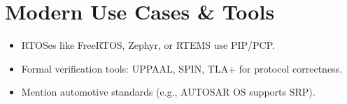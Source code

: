 \documentclass{article}
\begin{document}
 
\section{Modern Use Cases & Tools}
\begin{itemize}
    
\item RTOSes like FreeRTOS, Zephyr, or RTEMS use PIP/PCP.
\item Formal verification tools: UPPAAL, SPIN, TLA+ for protocol correctness.
\item Mention automotive standards (e.g., AUTOSAR OS supports SRP).
\end{itemize}
\end{document}
